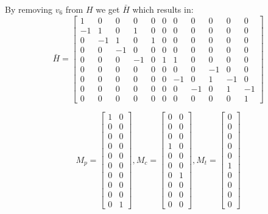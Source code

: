 	By removing $v_{6}$ from $H$ we get $\bar{H}$ which results in:
	\begin{equation}
		\bar{H} = \begin{bmatrix}
			1 & 0 & 0   & 0  & 0  & 0  & 0  & 0  & 0  & 0  & 0 \\
			-1 & 1 & 0  & 1  & 0  & 0  & 0  & 0  & 0  & 0  & 0 \\
			0 & -1 & 1  & 0  & 1  & 0  & 0  & 0  & 0  & 0  & 0 \\
			0 & 0  & -1 & 0  & 0  & 0  & 0  & 0  & 0  & 0  & 0 \\
			0 & 0  & 0  & -1 & 0  & 1  & 1  & 0  & 0  & 0  & 0 \\
			
			0 & 0  & 0  & 0  & 0  & 0  & 0  & 0  & -1 & 0  & 0 \\
			0 & 0  & 0  & 0  & 0  & 0  & -1 & 0  & 1  & -1 & 0 \\
			0 & 0  & 0  & 0  & 0  & 0  & 0  & -1 & 0  & 1  & -1 \\
			0 & 0  & 0  & 0  & 0  & 0  & 0  & 0  & 0  & 0  & 1 
		\end{bmatrix}
	\end{equation}
	
	
	
	\begin{equation*}
		M_{p} = \begin{bmatrix}
			1 & 0\\
			0 & 0\\
			0 & 0\\
			0 & 0\\
			0 & 0\\
			0 & 0\\
			0 & 0\\
			0 & 0\\
			0 & 0\\
			0 & 1
		\end{bmatrix},
		M_{c} = \begin{bmatrix}
			0 & 0\\
			0 & 0\\
			0 & 0\\
			1 & 0\\
			0 & 0\\
			0 & 0\\
			0 & 1\\
			0 & 0\\
			0 & 0\\
			0 & 0
		\end{bmatrix},
		M_{t} = \begin{bmatrix}
			0\\
			0\\
			0\\
			0\\
			0\\
			1\\
			0\\
			0\\
			0\\
			0
		\end{bmatrix}
	\end{equation*}
	
	
	

